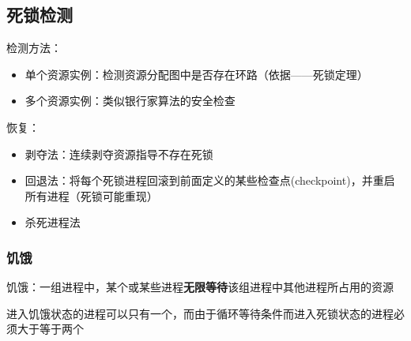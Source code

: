 \subsection{死锁检测}
检测方法：
\begin{itemize}
    \item 单个资源实例：检测资源分配图中是否存在环路（依据——死锁定理）
    \item 多个资源实例：类似银行家算法的安全检查
\end{itemize}

恢复：
\begin{itemize}
    \item 剥夺法：连续剥夺资源指导不存在死锁
    \item 回退法：将每个死锁进程回滚到前面定义的某些检查点(checkpoint)，并重启所有进程（死锁可能重现）
    \item 杀死进程法
\end{itemize}

\subsubsection{饥饿}
饥饿：一组进程中，某个或某些进程\textbf{无限等待}该组进程中其他进程所占用的资源

进入饥饿状态的进程可以只有一个，而由于循环等待条件而进入死锁状态的进程必须大于等于两个